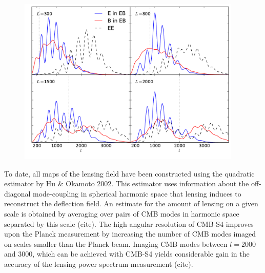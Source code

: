 \begin{figure}[h]
\includegraphics[width=0.95\textwidth]{CMBLensing/signal_contribs.pdf}
\caption{}
\end{figure}

To date, all maps of the lensing field have been constructed using the quadratic estimator by Hu \& Okamoto 2002.  This estimator uses information about the off-diagonal mode-coupling in spherical harmonic space that lensing induces to reconstruct the deflection field.  An estimate for the amount of lensing on a given scale is obtained by averaging over pairs of CMB modes in harmonic space separated by this scale (cite).  The high angular resolution of CMB-S4 improves upon the Planck measurement by increasing the number of CMB modes imaged on scales smaller than the Planck beam.  Imaging CMB modes between $l=2000$ and 3000, which can be achieved with CMB-S4 yields considerable gain in the accuracy of the lensing power spectrum measurement (cite).    

